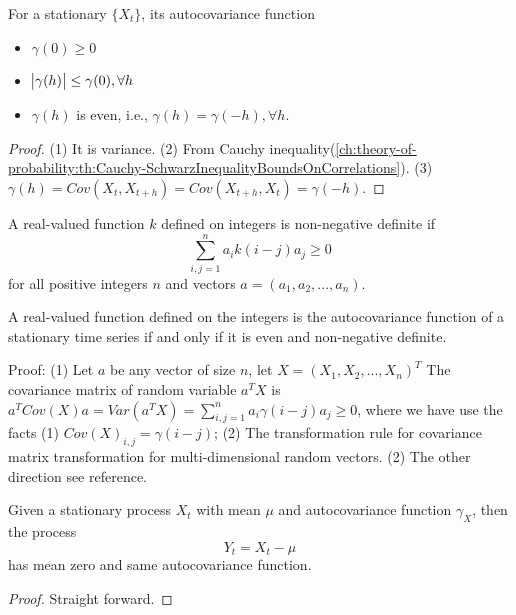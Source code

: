 \begin{lemma}
\cite[47]{brockwell2002introduction}For a stationary $\{X_t\}$, its autocovariance function
\begin{itemize}
    \item $\gamma(0) \geq 0$
    \item $\abs{\gamma(h)}\leq \gamma(0),\forall h$
    \item $\gamma(h)$  is even, i.e., $\gamma(h) = \gamma(-h), \forall h$.
\end{itemize}
\end{lemma}
\begin{proof}
	(1) It is variance. (2) From Cauchy inequality(\autoref{ch:theory-of-probability:th:Cauchy-SchwarzInequalityBoundsOnCorrelations}). (3) $\gamma(h) = Cov(X_t,X_{t+h}) = Cov(X_{t+h},X_t) = \gamma(-h)$.
\end{proof}





\begin{definition}
\cite[46]{brockwell2002introduction}
A real-valued function $k$ defined on integers is non-negative definite if
$$\sum_{i,j=1}^n a_i k(i-j)a_j \geq 0$$
for all positive integers $n$ and vectors $a=(a_1,a_2,...,a_n)$.
\end{definition}


\begin{theorem}
\cite[47]{brockwell2002introduction}A real-valued function defined on the integers is the autocovariance function of a stationary time series if and only if it is even and non-negative definite.
\end{theorem}
Proof: (1) Let $a$ be any vector of size $n$, let $X=(X_1,X_2,...,X_n)^T$ The covariance matrix of random variable $a^TX$ is $a^TCov(X)a = Var(a^TX) = \sum_{i,j=1}^n a_i \gamma(i-j)a_j \geq 0$, where we have use the facts (1) $Cov(X)_{i,j} = \gamma(i-j)$; (2) The transformation rule for covariance matrix transformation for multi-dimensional random vectors. (2) The other direction see reference. 


\begin{lemma}
Given a stationary process $X_t$ with mean $\mu$ and autocovariance function $\gamma_X$, then the process
	$$Y_t = X_t-\mu$$ has mean zero and same autocovariance function.
\end{lemma}
\begin{proof}
	Straight forward.
\end{proof}
